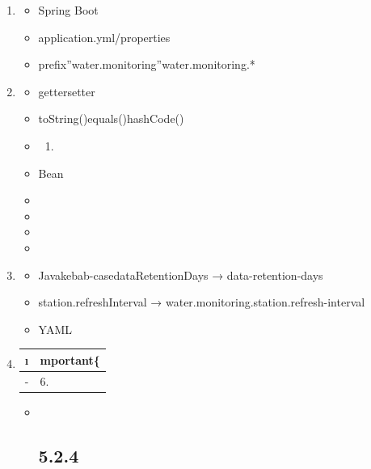 \begin{enumerate}
\def\labelenumi{\arabic{enumi}.}
\item

  \begin{itemize}
  \tightlist
  \item
    Spring Boot
  \item
    application.yml/properties
  \item
    prefix''water.monitoring''water.monitoring.*
  \end{itemize}
\item

  \begin{itemize}
  \item
    gettersetter
  \item
    toString()equals()hashCode()
  \item
    \begin{enumerate}
    \def\labelenumii{\arabic{enumii}.}
        \item
    \end{enumerate}
  \item
    Bean
  \item
  \item
  \item
  \item
  \end{itemize}
\item
  \important{}

  \begin{itemize}
  \tightlist
  \item
    Javakebab-casedataRetentionDays → data-retention-days
  \item
    station.refreshInterval → water.monitoring.station.refresh-interval
  \item
    YAML
  \end{itemize}
\item
  \begin{longtable}[]{@{}ll@{}}
  \toprule\noalign{}
  \i & mportant\{} \\
  \midrule\noalign{}
  \endhead
  \bottomrule\noalign{}
  \endlastfoot
  - & 6. \important{} \\
  \end{longtable}

  \begin{itemize}
  \item ~
    \hypertarget{section-30}{%
    \subsection{5.2.4}\label{section-30}}
  \end{itemize}
\end{enumerate}

